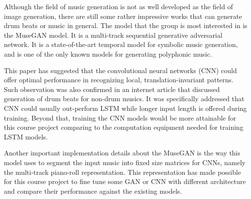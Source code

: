 \begin{par}
    \par \hspace{15pt} Although the field of music generation is not as well developed as the field of image generation, there are still some rather impressive works that can generate drum beats or music in general. The model that the group is most interested in is the MuseGAN \cite{musegan} model. It is a multi-track sequential generative adversarial network. It is a state-of-the-art temporal model for symbolic music generation, and is one of the only known models for generating polyphonic music. 
    
    \par This paper has suggested that the convolutional neural networks (CNN) could offer optimal performance in recognizing local, translation-invariant patterns. Such observation was also confirmed in an internet article \cite{lamb_of_God} that discussed generation of drum beats for non-drum musics. It was specifically addressed that CNN could usually out-perform LSTM while longer input length is offered during training. Beyond that, training the CNN models would be more attainable for this course project comparing to the computation equipment needed for training LSTM models.

    \par Another important implementation details about the MuseGAN is the way this model uses to segment the input music into fixed size matrices for CNNs, namely the multi-track piano-roll representation. This representation has made possible for this course project to fine tune some GAN or CNN with different architecture and compare their performance against the existing models. 

    


\end{par}